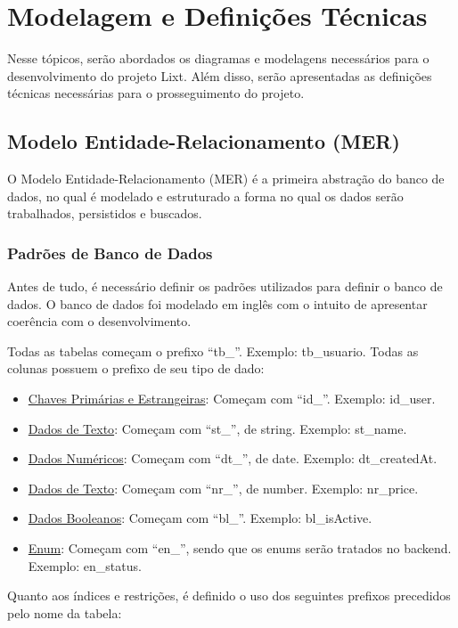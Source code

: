 \section{Modelagem e Definições Técnicas}

Nesse tópicos, serão abordados os diagramas e modelagens necessários para o desenvolvimento do projeto Lixt. Além disso, serão apresentadas as definições técnicas necessárias para o prosseguimento do projeto.

\subsection{Modelo Entidade-Relacionamento (MER)}

O Modelo Entidade-Relacionamento (MER) é a primeira abstração do banco de dados, no qual é modelado e estruturado a forma no qual os dados serão trabalhados, persistidos e buscados.

\subsubsection{Padrões de Banco de Dados}

Antes de tudo, é necessário definir os padrões utilizados para definir o banco de dados. O banco de dados foi modelado em inglês com o intuito de apresentar coerência com o desenvolvimento.

Todas as tabelas começam o prefixo ``tb\_''. Exemplo: tb\_usuario. Todas as colunas possuem o prefixo de seu tipo de dado:

\begin{itemize}
	\item \underline{Chaves Primárias e Estrangeiras}: Começam com ``id\_''. Exemplo: id\_user.
	\item \underline{Dados de Texto}: Começam com ``st\_'', de string. Exemplo: st\_name.
	\item \underline{Dados Numéricos}: Começam com ``dt\_'', de date. Exemplo: dt\_createdAt.
	\item \underline{Dados de Texto}: Começam com ``nr\_'', de number. Exemplo: nr\_price.  
		\item \underline{Dados Booleanos}: Começam com ``bl\_''. Exemplo: bl\_isActive.  
	\item \underline{Enum}: Começam com ``en\_'', sendo que os enums serão tratados no backend. Exemplo: en\_status.  
\end{itemize}

Quanto aos índices e restrições, é definido o uso dos seguintes prefixos precedidos pelo nome da tabela:

